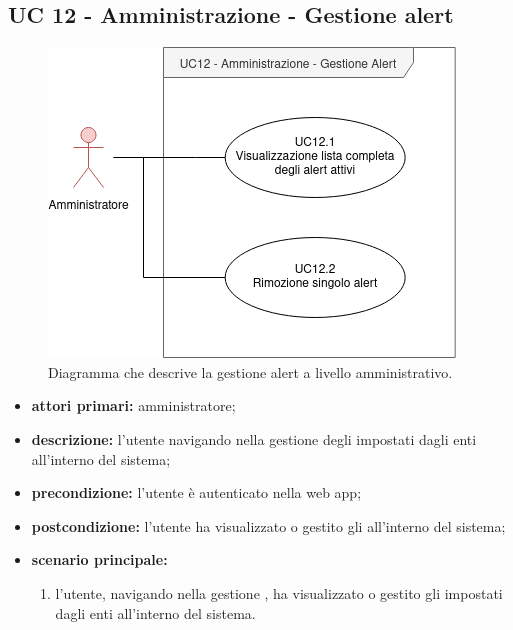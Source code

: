 	\subsection{UC 12 - Amministrazione - Gestione alert}

		\begin{figure}[H]
			\centering
			\includegraphics[scale=0.60]{res/images/uc12}
			\caption{Diagramma che descrive la gestione alert a livello amministrativo.}
		\end{figure}

		\begin{itemize}
			\item \textbf{attori primari:} amministratore;
			\item \textbf{descrizione:} l'utente navigando nella gestione degli  impostati dagli enti all'interno del sistema;
			\item \textbf{precondizione:} l'utente è autenticato nella web app;
			\item \textbf{postcondizione:} l'utente ha visualizzato o gestito gli  all'interno del sistema;
			\item \textbf{scenario principale:}
			\begin{enumerate}
				\item{l'utente, navigando nella gestione , ha visualizzato o gestito gli  impostati dagli enti all'interno del sistema.}
			\end{enumerate}
		\end{itemize}

